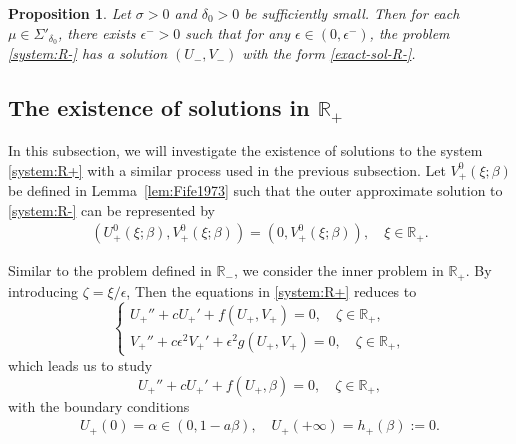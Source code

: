 \documentclass[11pt,a4paper]{article}
\newtheorem{proposition}[theorem]{\textbf{Proposition}}
\numberwithin{equation}{section}
\numberwithin{figure}{section}
\newcommand\ep{\epsilon}
\newcommand\bea{\begin{eqnarray}}
\newcommand\eea{\end{eqnarray}}
\newcommand\beaa{\begin{eqnarray*}}
\newcommand\eeaa{\end{eqnarray*}}
\begin{document}
\begin{proposition}\label{prop:R-}
Let $\sigma>0$ and $\delta_0>0$ be sufficiently small. Then for each
$\mu\in\Sigma'_{\delta_0}$, there exists $\ep^->0$ such that for any
$\ep\in(0,\ep^-)$, the problem \eqref{system:R-} has a solution $(U_{-},V_{-})$ with the form \eqref{exact-sol-R-}.
\end{proposition}



\subsection{The existence of solutions in $\mathbb{R}_{+}$}

In this subsection, we will investigate the existence of solutions to the system \eqref{system:R+} with a similar process used in
the previous subsection.
Let $V^0_{+}(\xi;\beta)$ be defined in Lemma~\ref{lem:Fife1973} such that
the outer approximate solution to \eqref{system:R-} can be represented by
\beaa
(U^0_{+}(\xi;\beta), V^0_{+}(\xi;\beta))=(0, V^0_{+}(\xi;\beta)),\quad \xi\in\mathbb{R_+}.
\eeaa


Similar to the problem defined in $\mathbb{R}_-$, we consider the inner problem in $\mathbb{R}_+$.  By introducing $\zeta=\xi/\epsilon$,
Then the equations in \eqref{system:R+} reduces to
\begin{equation}\label{system-zeta-R+}
\begin{cases}
U_{+}''+cU_{+}'+f(U_{+},V_{+})=0,\quad \zeta\in\mathbb{R}_+,\\
V_{+}''+c\epsilon^2 V_{+}'+\epsilon^2 g(U_{+},V_{+})=0,\quad \zeta\in\mathbb{R}_+,
\end{cases}
\end{equation}
which leads us to study
\begin{equation}\label{system-zeta-R+}
U_{+}''+cU_{+}'+f(U_{+},\beta)=0,\quad \zeta\in\mathbb{R}_+,
\end{equation}
with the boundary conditions
\bea\label{BC-zeta-R+}
U_+(0)=\alpha\in(0,1-a\beta),\quad  U_+(+\infty)=h_+(\beta):=0.
\eea
\end{document}
